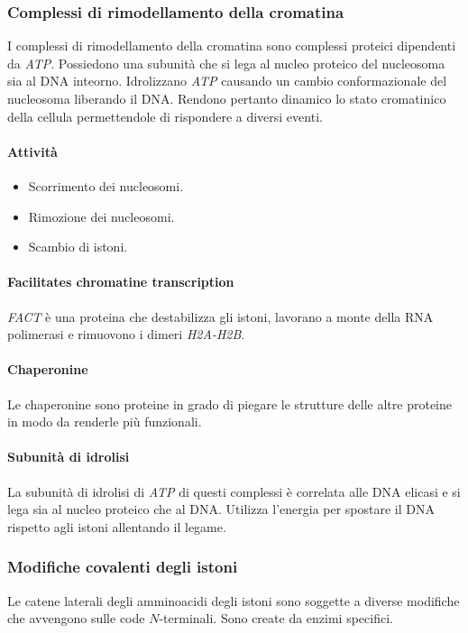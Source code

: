 		\subsubsection{Complessi di rimodellamento della cromatina}
		I complessi di rimodellamento della cromatina sono complessi proteici dipendenti da \emph{ATP}.
		Possiedono una subunit\`a che si lega al nucleo proteico del nucleosoma sia al DNA inteorno.
		Idrolizzano \emph{ATP} causando un cambio conformazionale del nucleosoma liberando il DNA.
		Rendono pertanto dinamico lo stato cromatinico della cellula permettendole di rispondere a diversi eventi.
		
			\paragraph{Attivit\`a}
			\begin{multicols}{2}
				\begin{itemize}
					\item Scorrimento dei nucleosomi.
					\item Rimozione dei nucleosomi.
					\item Scambio di istoni.
				\end{itemize}
			\end{multicols}

			\paragraph{Facilitates chromatine transcription}
			\emph{FACT} \`e una proteina che destabilizza gli istoni, lavorano a monte della RNA polimerasi e rimuovono i dimeri \emph{H2A-H2B}.

			\paragraph{Chaperonine}
			Le chaperonine sono proteine in grado di piegare le strutture delle altre proteine in modo da renderle pi\`u funzionali.

			\paragraph{Subunit\`a di idrolisi}
			La subunit\`a di idrolisi di \emph{ATP} di questi complessi \`e correlata alle DNA elicasi e si lega sia al nucleo proteico che al DNA.
			Utilizza l'energia per spostare il DNA rispetto agli istoni allentando il legame.

		\subsubsection{Modifiche covalenti degli istoni}
		Le catene laterali degli amminoacidi degli istoni sono soggette a diverse modifiche che avvengono sulle code $N$-terminali.
		Sono create da enzimi specifici.

